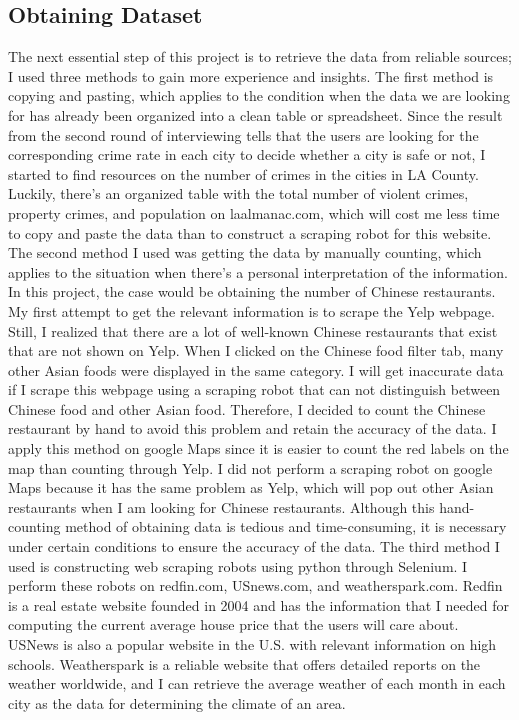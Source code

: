 \documentclass[10pt,twocolumn]{article}
\begin{document}
\subsection{Obtaining Dataset}
The next essential step of this project is to retrieve the data from reliable sources; I used three methods to gain more experience and insights. 
\newline
\indent
The first method is copying and pasting, which applies to the condition when the data we are looking for has already been organized into a clean table or spreadsheet. Since the result from the second round of interviewing tells that the users are looking for the corresponding crime rate in each city to decide whether a city is safe or not, I started to find resources on the number of crimes in the cities in LA County. Luckily, there's an organized table with the total number of violent crimes, property crimes, and population on laalmanac.com, which will cost me less time to copy and paste the data than to construct a scraping robot for this website. 
\newline
\indent
The second method I used was getting the data by manually counting, which applies to the situation when there's a personal interpretation of the information. In this project, the case would be obtaining the number of Chinese restaurants. My first attempt to get the relevant information is to scrape the Yelp webpage. Still, I realized that there are a lot of well-known Chinese restaurants that exist that are not shown on Yelp. When I clicked on the Chinese food filter tab, many other Asian foods were displayed in the same category. I will get inaccurate data if I scrape this webpage using a scraping robot that can not distinguish between Chinese food and other Asian food. Therefore, I decided to count the Chinese restaurant by hand to avoid this problem and retain the accuracy of the data. I apply this method on google Maps since it is easier to count the red labels on the map than counting through Yelp. I did not perform a scraping robot on google Maps because it has the same problem as Yelp, which will pop out other Asian restaurants when I am looking for Chinese restaurants. Although this hand-counting method of obtaining data is tedious and time-consuming, it is necessary under certain conditions to ensure the accuracy of the data. 
\newline
\indent
The third method I used is constructing web scraping robots using python through Selenium. I perform these robots on redfin.com, USnews.com, and weatherspark.com. Redfin is a real estate website founded in 2004 and has the information that I needed for computing the current average house price that the users will care about. USNews is also a popular website in the U.S. with relevant information on high schools. Weatherspark is a reliable website that offers detailed reports on the weather worldwide, and I can retrieve the average weather of each month in each city as the data for determining the climate of an area. 
\end{document}
